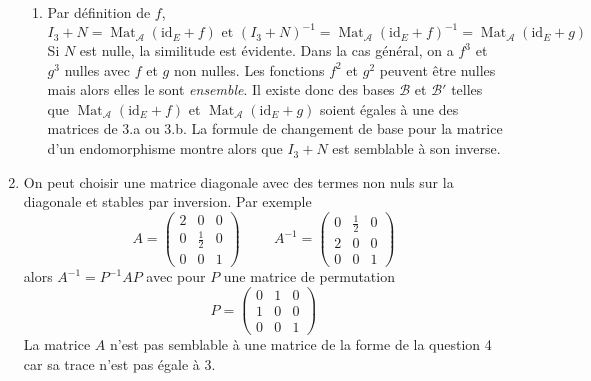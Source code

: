 \begin{enumerate}
\begin{enumerate}
 \item Par définition de $f$,
\begin{displaymath}
 I_3+N = \mathop{\mathrm{Mat}}_{\mathcal A}(\mathrm{id}_E+f)
\text{ et }
(I_3+N)^{-1} = \mathop{\mathrm{Mat}}_{\mathcal A}(\mathrm{id}_E+f)^{-1}=
\mathop{\mathrm{Mat}}_{\mathcal A}(\mathrm{id}_E+g)
\end{displaymath}
Si $N$ est nulle, la similitude est évidente. Dans la cas général, on a $f^3$ et $g^3$ nulles avec $f$ et $g$ non nulles. Les fonctions $f^2$ et $g^2$ peuvent être nulles mais alors elles le sont \emph{ensemble}. Il existe donc des bases $\mathcal B$ et $\mathcal B'$ telles que $\mathop{\mathrm{Mat}}_{\mathcal A}(\mathrm{id}_E+f)$ et $\mathop{\mathrm{Mat}}_{\mathcal A}(\mathrm{id}_E+g)$ soient égales à une des matrices de 3.a ou 3.b. La formule de changement de base pour la matrice d'un endomorphisme montre alors que $I_3+N$ est semblable à son inverse.
\end{enumerate}

 \item  On peut choisir une matrice diagonale avec des termes non nuls sur la diagonale et stables par inversion. Par exemple
\begin{displaymath}
 A=
\begin{pmatrix}
 2&0&0\\0&\frac{1}{2}&0\\0&0&1
\end{pmatrix}
\hspace{1cm}
A^{-1}=
\begin{pmatrix}
0&\frac{1}{2}&0\\ 2&0&0\\0&0&1
\end{pmatrix}
\end{displaymath}
alors
$A^{-1}=P^{-1}AP$ avec pour $P$ une matrice de permutation
\begin{displaymath}
 P=
\begin{pmatrix}
 0&1&0\\1&0&0\\0&0&1
\end{pmatrix}
\end{displaymath}
La matrice $A$ n'est pas semblable à une matrice de la forme de la question 4 car sa trace n'est pas égale à $3$.
\end{enumerate}
